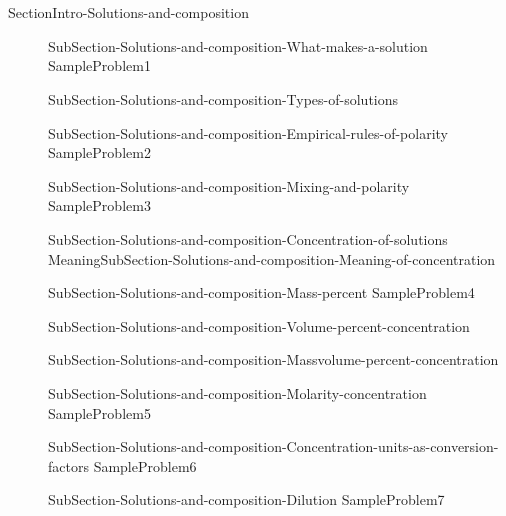\documentclass[main.tex]{subfiles} %
\begin{document}
\section{\color{blue!30!black}{Solutions and composition}}
{SectionIntro-Solutions-and-composition}
\sloppy\begin{description}
\item[]{SubSection-Solutions-and-composition-What-makes-a-solution}
{SampleProblem1}
\item[] {SubSection-Solutions-and-composition-Types-of-solutions}
 \hspace{-0cm}{Figure-Dissolution}
\item[] {SubSection-Solutions-and-composition-Empirical-rules-of-polarity}
{SampleProblem2}
\item[]{SubSection-Solutions-and-composition-Mixing-and-polarity}
 \hspace{2cm}{Table-Polarity-and-mixing}	
{SampleProblem3}
\item[]{SubSection-Solutions-and-composition-Concentration-of-solutions}
Meaning{SubSection-Solutions-and-composition-Meaning-of-concentration}
\item[]{SubSection-Solutions-and-composition-Mass-percent}
{SampleProblem4}
\item[] {SubSection-Solutions-and-composition-Volume-percent-concentration}
\item[]{SubSection-Solutions-and-composition-Massvolume-percent-concentration}
\item[]{SubSection-Solutions-and-composition-Molarity-concentration}
{SampleProblem5}
\item[]{SubSection-Solutions-and-composition-Concentration-units-as-conversion-factors}
{SampleProblem6}
\item[]{SubSection-Solutions-and-composition-Dilution}
{SampleProblem7}
\end{description}
\end{document}
